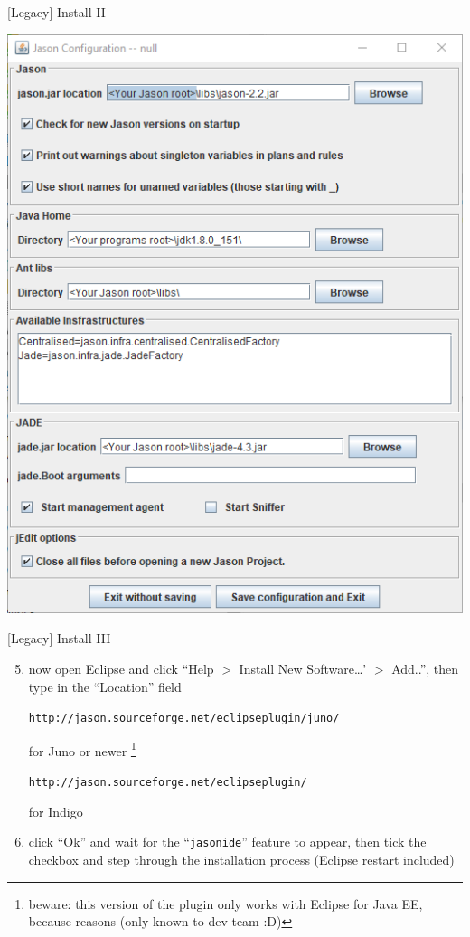 \documentclass[presentation]{beamer}\mode<presentation>{\usetheme{AMSBolognaFC}}
\begin{document}
\begin{frame}[c]{[Legacy] Install \jason{} II}
        
        \begin{center}
            \includegraphics[width=.45\linewidth]{./figures/jason_config.png}
        \end{center}
        
\end{frame}

\begin{frame}[c]{[Legacy] Install \jason{} III}
    \begin{enumerate}\setcounter{enumi}{4}
        
        \item now open Eclipse and click \alert{``Help $>$ Install New Software\ldots' $>$ Add..''}, then type in the ``Location'' field 
        \begin{center}
            \alert{\texttt{http://jason.sourceforge.net/eclipseplugin/juno/}}
        \end{center}
        for Juno or newer \footnote{beware: this version of the plugin only works with Eclipse for Java EE, because reasons (only known to \jason{} dev team :D)}
        \begin{center}
            \alert{\texttt{http://jason.sourceforge.net/eclipseplugin/}}
        \end{center}
        for Indigo
        
        \vfill
    
        \item click ``Ok'' and wait for the ``\texttt{jasonide}'' feature to appear, then tick the checkbox and step through the installation process (Eclipse restart included)
    \end{enumerate}

    \vfill
\end{frame}
\end{document}

